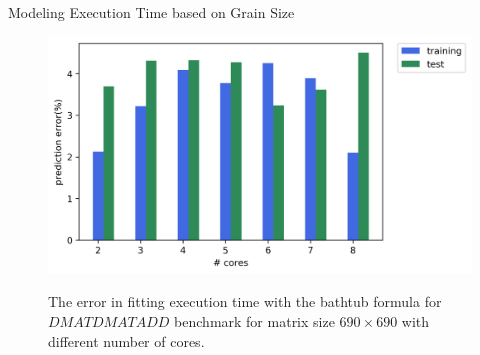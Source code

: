\documentclass[10pt]{beamer}
\begin{document}
\begin{frame}{Modeling Execution Time based on Grain Size}
	\begin{outline}	
\begin{figure}[H]
	\centering
	{\includegraphics[scale=.45]{images/bathtub/error_690.png}}	
	\caption{The error in fitting execution time with the bathtub formula for $DMATDMATADD$ benchmark for matrix size $690\times690$ with different number of cores.}	
	\label{fig23}
\end{figure}
\end{outline}
\end{frame}
\end{document}
